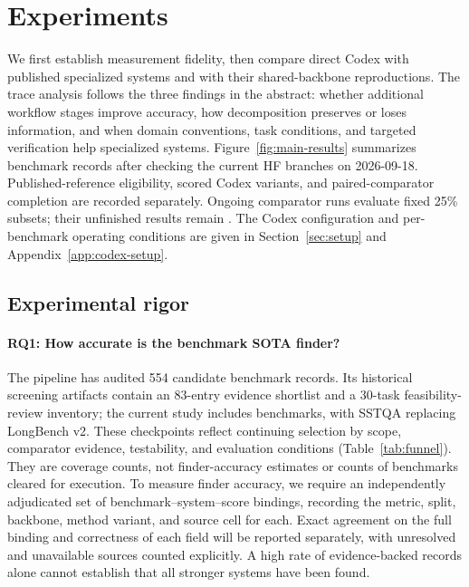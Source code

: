 \section{Experiments}
\label{sec:experiments}

We first establish measurement fidelity, then compare direct Codex with published specialized
systems and with their shared-backbone reproductions. The trace analysis follows the three
findings in the abstract: whether additional workflow stages improve accuracy, how decomposition
preserves or loses information, and when domain conventions, task conditions, and targeted
verification help specialized systems. Figure~\ref{fig:main-results}
summarizes \StudyBenchmarkCount{} benchmark records after checking the current HF branches
on 2026-09-18. Published-reference eligibility, scored Codex variants, and paired-comparator
completion are recorded separately. Ongoing comparator
runs evaluate fixed 25\% subsets; their unfinished results remain .
The Codex configuration and per-benchmark operating conditions are given in
Section~\ref{sec:setup} and Appendix~\ref{app:codex-setup}.

\subsection{Experimental rigor}
\label{sec:rigor}

\paragraph{RQ1: How accurate is the benchmark SOTA finder?}
The pipeline has audited 554 candidate benchmark records. Its historical screening artifacts
contain an 83-entry evidence shortlist and a 30-task feasibility-review inventory; the current
study includes \StudyBenchmarkCount{} benchmarks, with SSTQA replacing LongBench v2. These checkpoints
reflect continuing selection by scope, comparator evidence, testability, and evaluation conditions
(Table~\ref{tab:funnel}). They are coverage counts, not finder-accuracy estimates or counts of
benchmarks cleared for execution. To measure finder accuracy, we require an independently
adjudicated set of benchmark--system--score bindings, recording the metric, split, backbone,
method variant, and source cell for each. Exact agreement on the full binding and correctness
of each field will be reported separately, with unresolved and unavailable sources counted
explicitly.  A high rate of evidence-backed records alone cannot establish that
all stronger systems have been found.


